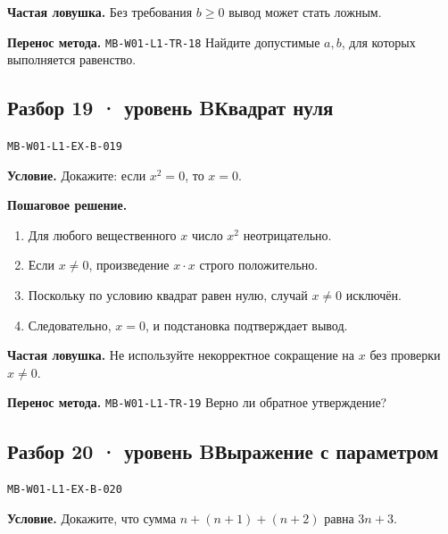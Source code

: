 \documentclass[11pt,a4paper,openany]{book}
\newcommand{\mtag}[1]{\textsf{\small\color{mbaccent}\bfseries #1}}
\newcommand{\muid}[1]{\texttt{\footnotesize #1}}
\begin{document}
\begin{learnbox}\textbf{Частая ловушка.} Без требования $b\ge0$ вывод может стать ложным.\par \textbf{Перенос метода.} \muid{MB-W01-L1-TR-18} Найдите допустимые $a,b$, для которых выполняется равенство.\end{learnbox}

\subsection*{\mtag{Разбор 19 · уровень B}\quad Квадрат нуля}\hypertarget{MB-W01-L1-EX-B-019}{}

\muid{MB-W01-L1-EX-B-019}\par

\begin{keybox}\textbf{Условие.} Докажите: если $x^2=0$, то $x=0$.\end{keybox}

\textbf{Пошаговое решение.}\par
\begin{enumerate}[label=\arabic*),leftmargin=*,itemsep=3pt,topsep=4pt]
\item Для любого вещественного $x$ число $x^2$ неотрицательно.
\item Если $x\ne0$, произведение $x\cdot x$ строго положительно.
\item Поскольку по условию квадрат равен нулю, случай $x\ne0$ исключён.
\item Следовательно, $x=0$, и подстановка подтверждает вывод.
\end{enumerate}


\begin{learnbox}\textbf{Частая ловушка.} Не используйте некорректное сокращение на $x$ без проверки $x\ne0$.\par \textbf{Перенос метода.} \muid{MB-W01-L1-TR-19} Верно ли обратное утверждение?\end{learnbox}

\subsection*{\mtag{Разбор 20 · уровень B}\quad Выражение с параметром}\hypertarget{MB-W01-L1-EX-B-020}{}

\muid{MB-W01-L1-EX-B-020}\par

\begin{keybox}\textbf{Условие.} Докажите, что сумма $n+(n+1)+(n+2)$ равна $3n+3$.\end{keybox}
\end{document}

